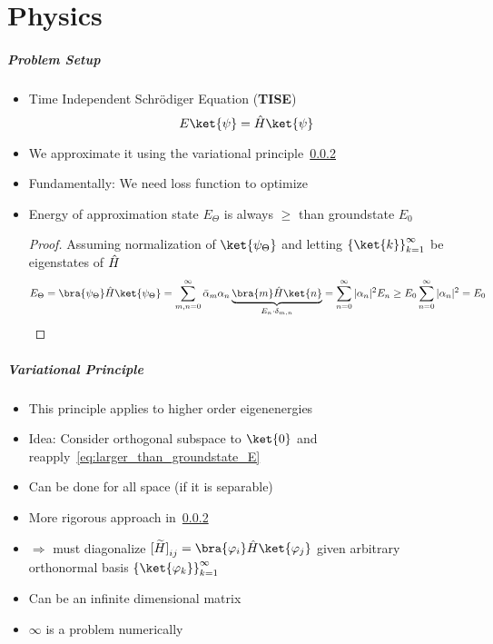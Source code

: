 \part[Part slide]{Physics}
\makepart%

\begin{frame}[t,label=intro]
    \frametitle{Problem Setup}
    \begin{itemize}[<+->]
        \setlength\itemsep{.5em}
        \item Time Independent Schrödiger Equation (\textbf{TISE}) 
        \[ E\ket{\psi} = \Hhat\ket{\psi}\]
        \item We approximate it using the variational principle~\ref{}
        \item Fundamentally: We need loss function to optimize
        \item Energy of approximation state $E_\Theta$ is always $\geq$ than groundstate $E_0$
        \begin{proof}
            Assuming normalization of $\ket{\psi_{\Theta}}$ and letting ${\{\ket{k}\}}_{k=1}^\infty$ be eigenstates of $\hat{H}$
            \begin{equation}
                E_\Theta = \bra{\psi_{\Theta}}\Hhat\ket{\psi_{\Theta}} = 
                \sum_{m, n = 0}^\infty \bar{\alpha}_m \alpha_n 
                \underbrace{\bra{m}\Hhat\ket{n}}_{E_n\cdot \delta_{m,n}}
                = \sum_{n=0}^\infty |\alpha_n|^2 E_n \geq E_0 \sum_{n=0}^\infty |\alpha_n|^2  = E_0
                \label{eq:larger_than_groundstate_E}
            \end{equation}
        \end{proof}
    \end{itemize}
\end{frame}

\begin{frame}
    \frametitle{Variational Principle}
    \begin{itemize}
        \setlength\itemsep{0.9em}
        \item This principle applies to higher order eigenenergies
        \item Idea: Consider orthogonal subspace to $\ket{0}$ and reapply~\eqref{eq:larger_than_groundstate_E}
        \item Can be done for all space (if it is separable)
        \item More rigorous approach in~\ref{}
        \item $\Rightarrow$ must diagonalize ${[\widetilde{H}]}_{ij}=\bra{\varphi_i}\Hhat\ket{\varphi_j}$
                given arbitrary orthonormal basis ${\{\ket{\varphi_k}\}}_{k=1}^\infty$
        \item Can be an infinite dimensional matrix
        \item $\infty$ is a problem numerically
    \end{itemize}
\end{frame}

